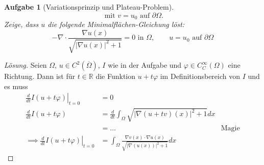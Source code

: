 \documentclass{scrartcl}
\newcommand{\abs}[1]{\left\lvert #1 \right\rvert}
\newcommand{\Rand}[1]{\partial #1}
\newcommand{\reals}{\mathbb{R}}
\newcommand{\closure}[1]{\overline{#1}}
\newtheorem {problem} {Aufgabe}
\theoremstyle{remark}
\begin{document}
\begin{problem}[Variationsprinzip und Plateau-Problem]
\begin{equation}
    \text{ mit } v = u_0 \text{ auf } \Rand {\Omega}.
  \end{equation}
  Zeige, dass $u$ die folgende Minimalflächen-Gleichung löst:
  \begin{equation}
    - \nabla
    \cdot
    \frac
      {\nabla u(x)}
      {\sqrt{\abs{\nabla u(x)}^2 + 1}}
    = 0 \text{ in } \Omega, \qquad u = u_0 \text{ auf } \Rand{\Omega}
  \end{equation}

  \end{problem}

  \begin{proof}[Lösung]
    Seien $\Omega$, $u \in C^2(\closure{\Omega})$, $I$ wie in der Aufgabe
    und $\varphi \in C_C^{\infty}(\Omega)$ eine Richtung.
    Dann ist für $t \in \reals$ die Funktion $u + t\varphi$ im Definitionsbereich von $I$ und es muss
    \begin{align}
      \left. \frac {d}{dt} I(u + t\varphi) \right|_{t = 0} & = 0 \\
      \frac {d}{dt} I(u + t\varphi)  &=
      \frac {d}{dt} \int_{\Omega} \sqrt{
        \abs{
          \nabla(u+tv) (x)
        }^2 + 1
      } d x\\
      & = \dots & \text{Magie}\\
      \implies \left. \frac {d}{dt} I(u + t\varphi) \right|_{t = 0} & =
      \int_{\Omega} \frac
        {\nabla v (x) \cdot \nabla u(x)}
        {\sqrt{
          \abs{
            \nabla (u(x))
            }^2 + 1
          }
        }
      d x
    \end{align}

  \end{proof}
\end{document}
